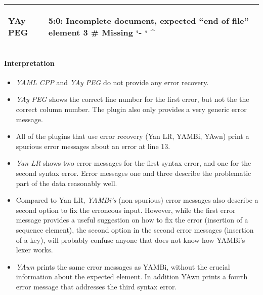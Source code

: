 \begin{table}[H]
\begin{adjustbox}{max width=\textwidth}
\begin{tabular}{lp{}}
    \vspace{0cm}
    YAy PEG &
    \vspace{-0.36cm}
    \begin{textcode}
      5:0: Incomplete document, expected “end of file”
               element 3 # Missing `- `
           ^
    \end{textcode}
    \\

    \bottomrule

  \end{tabular}
  \end{adjustbox}

\end{table}

\paragraph{Interpretation}

\begin{itemize}

  \item \emph{YAML CPP} and \emph{YAy PEG} do not provide any error recovery.

  \item \emph{YAy PEG} shows the correct line number for the first error, but not the the correct column number. The plugin also only provides a very generic error message.

  \item All of the plugins that use error recovery (Yan LR, YAMBi, YAwn) print a spurious error messages about an error at line 13.

  \item \emph{Yan LR} shows two error messages for the first syntax error, and one for the second syntax error. Error messages one and three describe the problematic part of the  data reasonably well.

  \item Compared to Yan LR, \emph{YAMBi’s} (non-spurious) error messages also describe a second option to fix the erroneous input. However, while the first error message provides a useful suggestion on how to fix the error (insertion of a sequence element), the second option in the second error messages (insertion of a key), will probably confuse anyone that does not know how YAMBi’s lexer works.

  \item \emph{YAwn} prints the same error messages as YAMBi, without the crucial information about the expected element. In addition YAwn prints a fourth error message that addresses the third syntax error.

\end{itemize}

